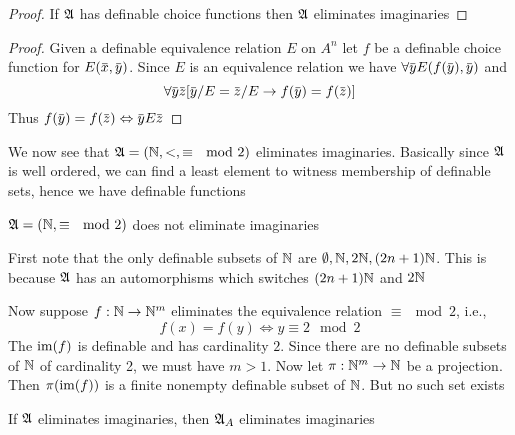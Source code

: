 \documentclass[11pt]{article}
\begin{document}
\begin{proof}
If \(\mathfrak{A}\) has definable choice functions then \(\mathfrak{A}\) eliminates imaginaries
\end{proof}

\begin{proof}
Given a definable equivalence relation \(E\) on \(A^n\) let \(f\) be a definable choice function
for \(E(\barx,\bary)\). Since \(E\) is an equivalence relation we have \(\forall\bary E(f(\bary),\bary)\) and
\begin{equation*}
\forall\bary\barz[\bary/E=\barz/E\to f(\bary)=f(\barz)]
\end{equation*}
Thus \(f(\bary)=f(\barz)\Leftrightarrow\bary E\barz\)
\end{proof}

\begin{examplle}[]
We now see that \(\mathfrak{A}=(\mathbb{N},<,\equiv\mod 2)\)  eliminates imaginaries. Basically since \(\mathfrak{A}\) is well
ordered, we can find a least element to witness membership of definable sets, hence we have
definable functions
\end{examplle}

\begin{examplle}[]
\(\mathfrak{A}=(\mathbb{N},\equiv\mod 2)\) does not eliminate imaginaries

First note that the only definable subsets of \(\mathbb{N}\) are \(\emptyset,\mathbb{N},2\mathbb{N},(2n+1)\mathbb{N}\). This is
because \(\mathfrak{A}\) has an automorphisms which switches \((2n+1)\mathbb{N}\) and \(2\mathbb{N}\)

Now suppose \(f:\mathbb{N}\to\mathbb{N}^m\)  eliminates the equivalence relation \(\equiv\mod 2\), i.e.,
\begin{equation*}
f(x)=f(y)\Leftrightarrow y\equiv 2\mod 2
\end{equation*}
The \(\operatorname{im}(f)\) is definable and has cardinality \(2\). Since there are no definable subsets
of \(\mathbb{N}\) of cardinality 2, we must have \(m>1\). Now let \(\pi:\mathbb{N}^m\to\mathbb{N}\) be a projection.
Then \(\pi(\operatorname{im}(f))\) is a finite nonempty definable subset of \(\mathbb{N}\). But no such set exists
\end{examplle}

\begin{proposition}[]
If \(\mathfrak{A}\) eliminates imaginaries, then \(\mathfrak{A}_A\) eliminates imaginaries
\end{proposition}
\end{document}
